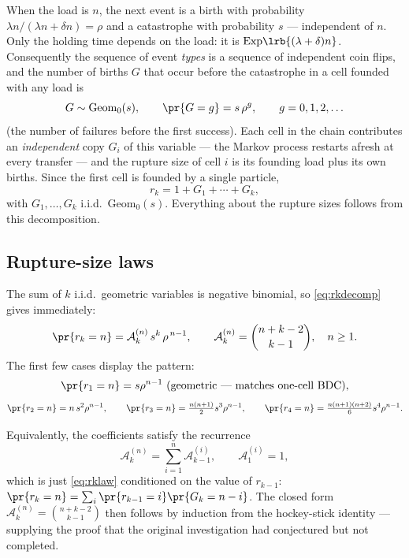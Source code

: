 When the load is $n$, the next event is a birth with probability
$\lambda n/(\lambda n+\delta n)=\rho$ and a catastrophe with probability $s$
--- independent of $n$. Only the holding time depends on the load: it is
$\mathrm{Exp}\lrb{(\lambda+\delta)n}$. Consequently the sequence of event
\emph{types} is a sequence of independent coin flips, and the number of
births $G$ that occur before the catastrophe in a cell founded with any load
is
\begin{equation}
G\sim\mathrm{Geom}_0(s),
\qquad
\pr{G=g}=s\,\rho^g,\qquad g=0,1,2,\ldots
\end{equation}
(the number of failures before the first success). Each cell in the chain
contributes an \emph{independent} copy $G_i$ of this variable --- the Markov
process restarts afresh at every transfer --- and the rupture size of cell
$i$ is its founding load plus its own births. Since the first cell is
founded by a single particle,
\begin{equation}
r_k = 1 + G_1 + \cdots + G_k,
\label{eq:rkdecomp}
\end{equation}
with $G_1,\ldots,G_k$ i.i.d.\ $\mathrm{Geom}_0(s)$. Everything about the
rupture sizes follows from this decomposition.

\subsection{Rupture-size laws}

The sum of $k$ i.i.d.\ geometric variables is negative binomial, so
\eqref{eq:rkdecomp} gives immediately:
\begin{equation}
\pr{r_k=n}=\mathcal{A}^{(n)}_{k}\,s^{k}\,\rho^{\,n-1},
\qquad
\mathcal{A}^{(n)}_{k}=\binom{n+k-2}{k-1},
\quad n\ge1.
\label{eq:rklaw}
\end{equation}
The first few cases display the pattern:
\begin{equation}
\pr{r_1=n}=s\rho^{n-1}\ \text{(geometric --- matches one-cell BDC)},
\end{equation}
\begin{equation}
\pr{r_2=n}=n\,s^2\rho^{n-1},
\qquad
\pr{r_3=n}=\tfrac{n(n+1)}{2}s^3\rho^{n-1},
\qquad
\pr{r_4=n}=\tfrac{n(n+1)(n+2)}{6}s^4\rho^{n-1}.
\end{equation}

Equivalently, the coefficients satisfy the recurrence
\begin{equation}
\mathcal{A}^{(n)}_{k}=\sum_{i=1}^{n}\mathcal{A}^{(i)}_{k-1},
\qquad
\mathcal{A}^{(i)}_{1}=1,
\end{equation}
which is just \eqref{eq:rklaw} conditioned on the value of $r_{k-1}$:
$\pr{r_k=n}=\sum_i\pr{r_{k-1}=i}\pr{G_k=n-i}$. The closed form
$\mathcal{A}^{(n)}_{k}=\binom{n+k-2}{k-1}$ then follows by induction from
the hockey-stick identity --- supplying the proof that the original
investigation had conjectured but not completed.

